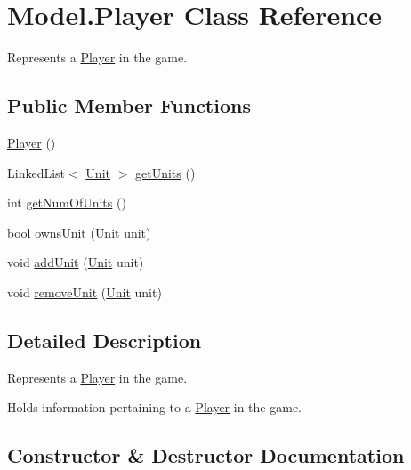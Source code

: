 \hypertarget{class_model_1_1_player}{}\section{Model.\+Player Class Reference}
\label{class_model_1_1_player}


Represents a \hyperlink{class_model_1_1_player}{Player} in the game.  


\subsection*{Public Member Functions}
\begin{DoxyCompactItemize}
\item 
\hyperlink{class_model_1_1_player_a7d58b47184f288c3e9edffbbe1580170}{Player} ()
\item 
Linked\+List$<$ \hyperlink{interface_model_1_1_unit_module_1_1_unit}{Unit} $>$ \hyperlink{class_model_1_1_player_a3c61df9a7f3755ed7355e4a3cd4e685a}{get\+Units} ()
\item 
int \hyperlink{class_model_1_1_player_ad128636680b101f6c4462d6630368a56}{get\+Num\+Of\+Units} ()
\item 
bool \hyperlink{class_model_1_1_player_a13d973c52472d7f54e4a3451ae16236e}{owns\+Unit} (\hyperlink{interface_model_1_1_unit_module_1_1_unit}{Unit} unit)
\item 
void \hyperlink{class_model_1_1_player_a6eb0891c6c56bc41c87b3ebd4bbe3cb0}{add\+Unit} (\hyperlink{interface_model_1_1_unit_module_1_1_unit}{Unit} unit)
\item 
void \hyperlink{class_model_1_1_player_a3f76bd1d64c2e53f7d70842140a703b3}{remove\+Unit} (\hyperlink{interface_model_1_1_unit_module_1_1_unit}{Unit} unit)
\end{DoxyCompactItemize}


\subsection{Detailed Description}
Represents a \hyperlink{class_model_1_1_player}{Player} in the game. 

Holds information pertaining to a \hyperlink{class_model_1_1_player}{Player} in the game. 

\subsection{Constructor \& Destructor Documentation}
\hypertarget{class_model_1_1_player_a7d58b47184f288c3e9edffbbe1580170}{}\label{class_model_1_1_player_a7d58b47184f288c3e9edffbbe1580170} 
